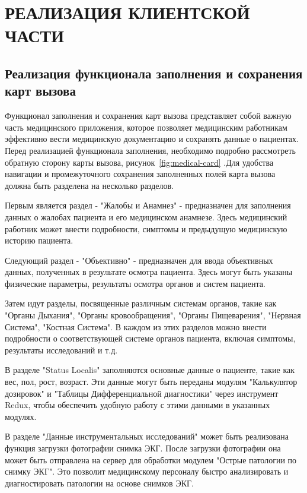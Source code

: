 \section{РЕАЛИЗАЦИЯ КЛИЕНТСКОЙ ЧАСТИ}

\subsection{Реализация функционала заполнения и сохранения карт вызова}

Функционал заполнения и сохранения карт вызова представляет собой важную часть медицинского приложения, которое позволяет медицинским работникам эффективно вести медицинскую документацию и сохранять данные о пациентах. Перед реализацией функционала заполнения, необходимо подробно рассмотреть обратную сторону карты вызова, рисунок~\ref{fig:medical-card} .Для удобства навигации и промежуточного сохранения заполненных полей карта вызова должна быть разделена на несколько разделов.

Первым является раздел  - "Жалобы и Анамнез" - предназначен для заполнения данных о жалобах пациента и его медицинском анамнезе. Здесь медицинский работник может внести подробности, симптомы и предыдущую медицинскую историю пациента.

Следующий раздел - "Объективно" - предназначен для ввода объективных данных, полученных в результате осмотра пациента. Здесь могут быть указаны физические параметры, результаты осмотра органов и систем пациента.

Затем идут разделы, посвященные различным системам органов, такие как "Органы Дыхания", "Органы кровообращения", "Органы Пищеварения", "Нервная Система", "Костная Система". В каждом из этих разделов можно внести подробности о соответствующей системе органов пациента, включая симптомы, результаты исследований и т.д.

В разделе "Status Localis" заполняются основные данные о пациенте, такие как вес, пол, рост, возраст. Эти данные могут быть переданы модулям "Калькулятор дозировок" и "Таблицы Дифференциальной диагностики" через инструмент Redux, чтобы обеспечить удобную работу с этими данными в указанных модулях.

В разделе "Данные инструментальных исследований" может быть реализована функция загрузки фотографии снимка ЭКГ. После загрузки фотографии она может быть отправлена на сервер для обработки модулем "Острые патологии по снимку ЭКГ". Это позволит медицинскому персоналу быстро анализировать и диагностировать патологии на основе снимков ЭКГ.

